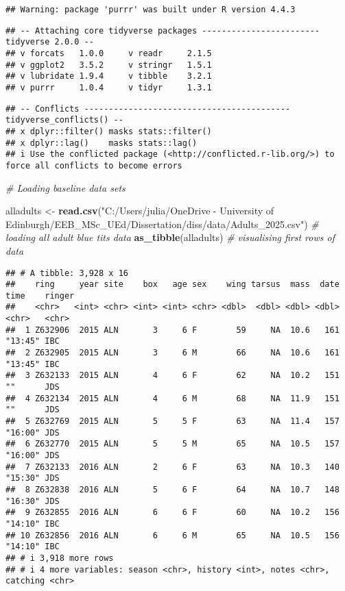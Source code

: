 \documentclass[
]{article}
\newenvironment{Shaded}{\begin{snugshade}}{\end{snugshade}}
\newcommand{\CommentTok}[1]{\textcolor[rgb]{0.56,0.35,0.01}{\textit{#1}}}
\newcommand{\FunctionTok}[1]{\textcolor[rgb]{0.13,0.29,0.53}{\textbf{#1}}}
\newcommand{\NormalTok}[1]{#1}
\newcommand{\OtherTok}[1]{\textcolor[rgb]{0.56,0.35,0.01}{#1}}
\newcommand{\StringTok}[1]{\textcolor[rgb]{0.31,0.60,0.02}{#1}}
\begin{document}
\begin{verbatim}
## Warning: package 'purrr' was built under R version 4.4.3
\end{verbatim}

\begin{verbatim}
## -- Attaching core tidyverse packages ------------------------ tidyverse 2.0.0 --
## v forcats   1.0.0     v readr     2.1.5
## v ggplot2   3.5.2     v stringr   1.5.1
## v lubridate 1.9.4     v tibble    3.2.1
## v purrr     1.0.4     v tidyr     1.3.1
\end{verbatim}

\begin{verbatim}
## -- Conflicts ------------------------------------------ tidyverse_conflicts() --
## x dplyr::filter() masks stats::filter()
## x dplyr::lag()    masks stats::lag()
## i Use the conflicted package (<http://conflicted.r-lib.org/>) to force all conflicts to become errors
\end{verbatim}

\begin{Shaded}
\begin{Highlighting}[]
\CommentTok{\# Loading baseline data sets}

\NormalTok{alladults }\OtherTok{\textless{}{-}} \FunctionTok{read.csv}\NormalTok{(}\StringTok{"C:/Users/julia/OneDrive {-} University of Edinburgh/EEB\_MSc\_UEd/Dissertation/diss/data/Adults\_2025.csv"}\NormalTok{)  }\CommentTok{\# loading all adult blue tits data}
\FunctionTok{as\_tibble}\NormalTok{(alladults)  }\CommentTok{\# visualising first rows of data}
\end{Highlighting}
\end{Shaded}

\begin{verbatim}
## # A tibble: 3,928 x 16
##    ring     year site    box   age sex    wing tarsus  mass  date time    ringer
##    <chr>   <int> <chr> <int> <int> <chr> <dbl>  <dbl> <dbl> <dbl> <chr>   <chr> 
##  1 Z632906  2015 ALN       3     6 F        59     NA  10.6   161 "13:45" IBC   
##  2 Z632905  2015 ALN       3     6 M        66     NA  10.6   161 "13:45" IBC   
##  3 Z632133  2015 ALN       4     6 F        62     NA  10.2   151 ""      JDS   
##  4 Z632134  2015 ALN       4     6 M        68     NA  11.9   151 ""      JDS   
##  5 Z632769  2015 ALN       5     5 F        63     NA  11.4   157 "16:00" JDS   
##  6 Z632770  2015 ALN       5     5 M        65     NA  10.5   157 "16:00" JDS   
##  7 Z632133  2016 ALN       2     6 F        63     NA  10.3   140 "15:30" JDS   
##  8 Z632838  2016 ALN       5     6 F        64     NA  10.7   148 "16:30" JDS   
##  9 Z632855  2016 ALN       6     6 F        60     NA  10.2   156 "14:10" IBC   
## 10 Z632856  2016 ALN       6     6 M        65     NA  10.5   156 "14:10" IBC   
## # i 3,918 more rows
## # i 4 more variables: season <chr>, history <int>, notes <chr>, catching <chr>
\end{verbatim}
\end{document}
